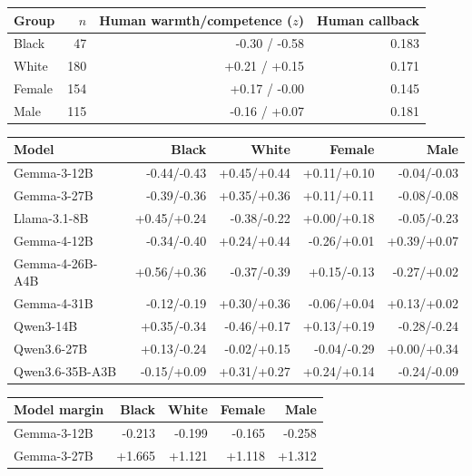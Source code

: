 \begin{table}[t]
\centering
\scriptsize
\setlength{\tabcolsep}{3pt}
\begin{tabular}{@{}lrrr@{}}
\toprule
Group & $n$ & Human warmth/competence ($z$) & Human callback \\
\midrule
Black & 47 & -0.30 / -0.58 & 0.183 \\
White & 180 & +0.21 / +0.15 & 0.171 \\
Female & 154 & +0.17 / -0.00 & 0.145 \\
Male & 115 & -0.16 / +0.07 & 0.181 \\
\bottomrule
\end{tabular}
\par\medskip
\begin{tabular}{@{}lrrrr@{}}
\toprule
Model & Black & White & Female & Male \\
\midrule
Gemma-3-12B & -0.44/-0.43 & +0.45/+0.44 & +0.11/+0.10 & -0.04/-0.03 \\
Gemma-3-27B & -0.39/-0.36 & +0.35/+0.36 & +0.11/+0.11 & -0.08/-0.08 \\
Llama-3.1-8B & +0.45/+0.24 & -0.38/-0.22 & +0.00/+0.18 & -0.05/-0.23 \\
Gemma-4-12B & -0.34/-0.40 & +0.24/+0.44 & -0.26/+0.01 & +0.39/+0.07 \\
Gemma-4-26B-A4B & +0.56/+0.36 & -0.37/-0.39 & +0.15/-0.13 & -0.27/+0.02 \\
Gemma-4-31B & -0.12/-0.19 & +0.30/+0.36 & -0.06/+0.04 & +0.13/+0.02 \\
Qwen3-14B & +0.35/-0.34 & -0.46/+0.17 & +0.13/+0.19 & -0.28/-0.24 \\
Qwen3.6-27B & +0.13/-0.24 & -0.02/+0.15 & -0.04/-0.29 & +0.00/+0.34 \\
Qwen3.6-35B-A3B & -0.15/+0.09 & +0.31/+0.27 & +0.24/+0.14 & -0.24/-0.09 \\
\bottomrule
\end{tabular}
\par\medskip
\begin{tabular}{@{}lrrrr@{}}
\toprule
Model margin & Black & White & Female & Male \\
\midrule
Gemma-3-12B & -0.213 & -0.199 & -0.165 & -0.258 \\
Gemma-3-27B & +1.665 & +1.121 & +1.118 & +1.312 \\

\end{tabular}
\end{table}
